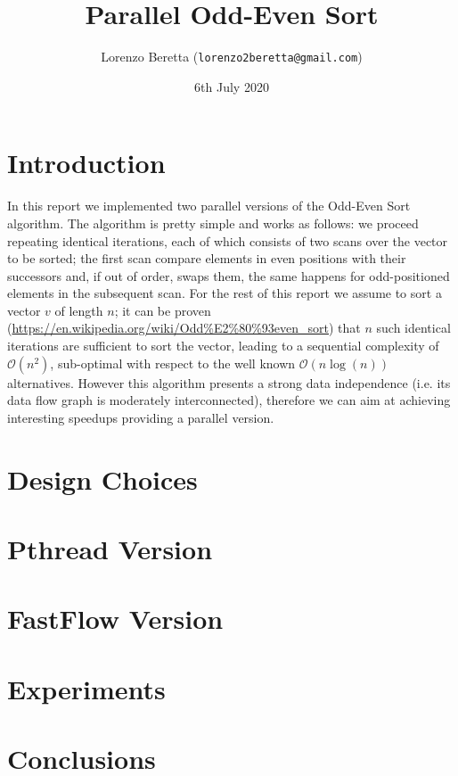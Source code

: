\documentclass[12pt]{article}
\title{Parallel Odd-Even Sort}
\author{Lorenzo Beretta (\texttt{lorenzo2beretta@gmail.com})}
\date{6th July 2020}
\begin{document}
\maketitle

\section{Introduction}
In this report we implemented two parallel versions of the Odd-Even
Sort algorithm. The algorithm is pretty simple and works as follows:
we proceed repeating identical iterations, each of which consists of two
scans over the vector to be sorted; the first scan compare elements in
even positions with their successors and, if out of order, swaps
them, the same happens for odd-positioned elements in the subsequent
scan. For the rest of this report we assume to sort a vector $v$ of
length $n$; it can be proven
(\href{https://en.wikipedia.org/wiki/Odd\%E2\%80\%93even_sort}{https://en.wikipedia.org/wiki/Odd\%E2\%80\%93even_sort})
that $n$ such identical iterations are sufficient to sort the vector,
leading to a sequential complexity of $\mathcal{O}(n^2)$, sub-optimal
with respect to the well known $\mathcal{O}(n\log(n))$ alternatives.
However this algorithm presents a strong data independence (i.e. its data
flow graph is moderately interconnected), therefore we can aim at
achieving interesting speedups providing a parallel version.

\section{Design Choices}



\section{Pthread Version}


\section{FastFlow Version}

\section{Experiments}

\section{Conclusions}

  

\end{document}
